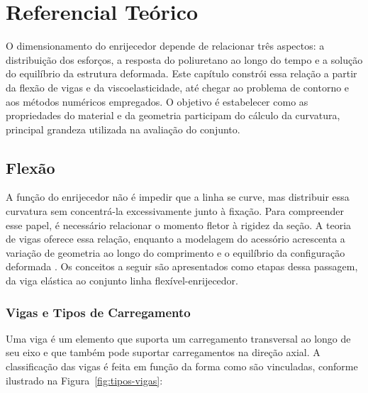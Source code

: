 \documentclass[arial,centeredequations,english,brazilian,oneside,section=TITLE]{ifes8}
\begin{document}
\chapter{Referencial Teórico}
\label{cha:referencial-teorico}

O dimensionamento do enrijecedor depende de relacionar três aspectos: a distribuição
dos esforços, a resposta do poliuretano ao longo do tempo e a solução do equilíbrio
da estrutura deformada. Este capítulo constrói essa relação a partir da flexão de
vigas e da viscoelasticidade, até chegar ao problema de contorno e aos métodos
numéricos empregados. O objetivo é estabelecer como as propriedades do material e
da geometria participam do cálculo da curvatura, principal grandeza utilizada na
avaliação do conjunto.


\section{Flexão}
\label{sec:flexao}

A função do enrijecedor não é impedir que a linha se curve, mas distribuir essa
curvatura sem concentrá-la excessivamente junto à fixação. Para compreender esse
papel, é necessário relacionar o momento fletor à rigidez da seção. A teoria de
vigas oferece essa relação, enquanto a modelagem do acessório acrescenta a variação
de geometria ao longo do comprimento e o equilíbrio da configuração deformada
\cite{Norton2013,Souza2008}. Os conceitos a seguir são apresentados como etapas
dessa passagem, da viga elástica ao conjunto linha flexível-enrijecedor.

\subsection{Vigas e Tipos de Carregamento}
\label{sub:vigas-carregamentos}

Uma viga é um elemento que suporta um
carregamento transversal ao longo de seu eixo e que também pode suportar carregamentos
na direção axial. A classificação das vigas é feita em função da forma como são
vinculadas, conforme ilustrado na Figura~\ref{fig:tipos-vigas}:
\end{document}
